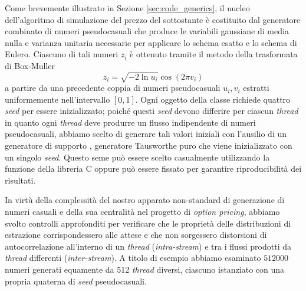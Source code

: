 Come brevemente illustrato in Sezione \ref{sec:code_generics}, il nucleo dell'algoritmo di simulazione del prezzo del sottostante è costituito dal generatore combinato di numeri pseudocasuali che produce le variabili gaussiane di media nulla e varianza unitaria necessarie per applicare lo schema esatto e lo schema di Eulero. Ciascuno di tali numeri $z_i$ è ottenuto tramite il metodo della trasformata di Box-Muller
\begin{equation}
    z_i = \sqrt{-2 \ln{u_i}} \cos{\left(2\pi v_i\right)}
    \label{eq:BoxMuller}
\end{equation}
a partire da una precedente coppia di numeri pseudocasuali $u_i, v_i$ estratti uniformemente nell'intervallo $[0,1]$. Ogni oggetto della classe  richiede quattro \textit{seed} per essere inizializzato; poiché questi \textit{seed} devono differire per ciascun \textit{thread} in quanto ogni \textit{thread} deve produrre un flusso indipendente di numeri pseudocasuali, abbiamo scelto di generare tali valori iniziali con l'ausilio di un generatore di supporto , generatore Tausworthe puro che viene inizializzato con un singolo \textit{seed}. Questo seme può essere scelto casualmente utilizzando la funzione  della libreria C  oppure può essere fissato per garantire riproducibilità dei risultati.

In virtù della complessità del nostro apparato non-standard di generazione di numeri casuali e della sua centralità nel progetto di \textit{option pricing}, abbiamo svolto controlli approfonditi per verificare che le proprietà delle distribuzioni di estrazione corrispondessero alle attese e che non sorgessero distorsioni di autocorrelazione all'interno di un \textit{thread} (\textit{intra-stream}) e tra i flussi prodotti da \textit{thread} differenti (\textit{inter-stream}). A titolo di esempio abbiamo esaminato $512000$ numeri generati equamente da 512 \textit{thread} diversi, ciascuno istanziato con una propria quaterna di \textit{seed} pseudocasuali.

